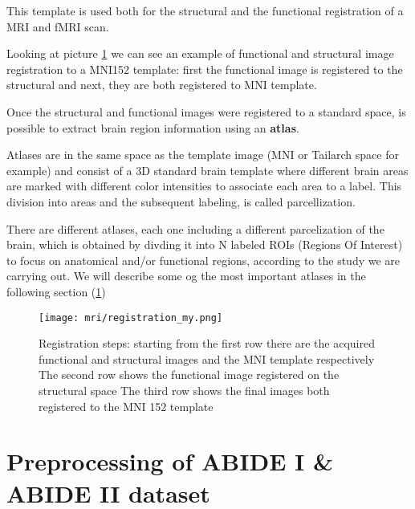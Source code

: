 \documentclass[11pt]{report}
\begin{document}
This template is used both for the structural and the functional registration of a MRI and fMRI scan.

Looking at picture \ref{fig:registrationchart} we can see an example of functional and structural image registration to a MNI152 template: first the functional image is registered to the structural and next, they are both registered to MNI template.

Once the structural and functional images were registered to a standard space, is possible to extract brain region information using an \textbf{atlas}.

Atlases are in the same space as the template image (MNI or Tailarch space for example) and consist of a 3D standard brain template where different brain areas are marked with different color intensities to associate each area to a label.
This division into areas and the subsequent labeling, is called parcellization.

There are different atlases, each one including a different parcelization of the brain, which is obtained by divding it into N labeled ROIs
(Regions Of Interest) to focus on anatomical and/or functional regions, according to the study we are carrying out.
We will describe some og the most important atlases in the following section (\ref{sec:cpac})




\begin{figure}
\centering
\texttt{[image: mri/registration\_my.png]}
\caption{Registration steps:
 starting from the first row there are the acquired functional and structural images and the MNI template respectively
 The second row shows the functional image registered on the structural space
 The third row shows the final images both registered to the MNI 152 template
}
\label{fig:registrationchart}
\end{figure}



\section{Preprocessing of ABIDE I \& ABIDE II dataset}\label{sec:cpac}
\end{document}
